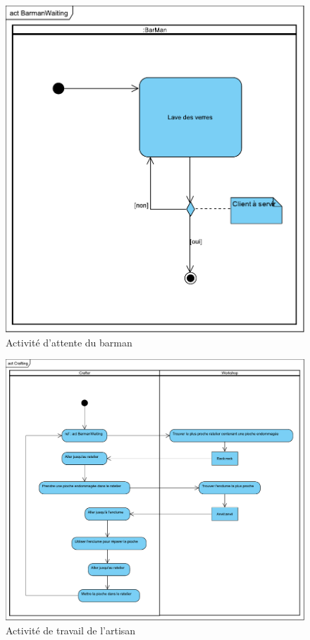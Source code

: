 \documentclass[a4paper]{report}
\begin{document}
\begin{figure}[H]
    \center
    \includegraphics[width=15cm]{img/act/BarmanWaiting}
    \caption{Activité d'attente du barman}
		\label{}
\end{figure}

\begin{figure}[H]
    \center
    \includegraphics[width=15cm]{img/act/Crafting}
    \caption{Activité de travail de l'artisan}
		\label{}
\end{figure}
\end{document}
